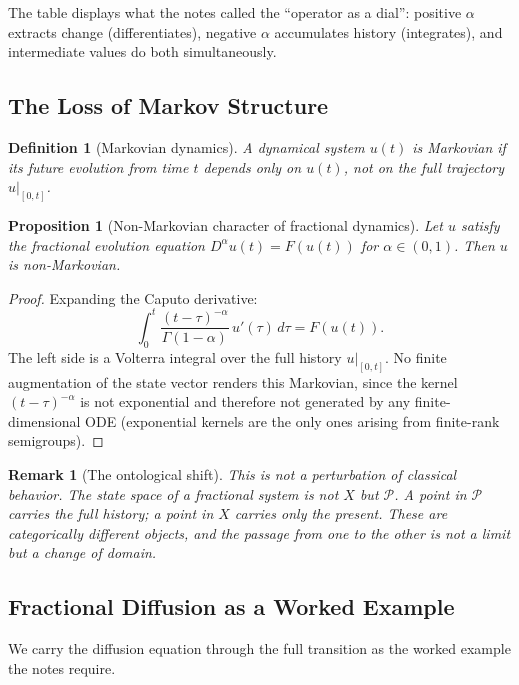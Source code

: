 \documentclass[12pt]{article}
\newtheorem{proposition}[theorem]{Proposition}
\newtheorem{definition}[theorem]{Definition}
\newtheorem{remark}[theorem]{Remark}
\newcommand{\Pcal}{\mathcal{P}}
\begin{document}
The table displays what the notes called the ``operator as a dial'':
positive $\alpha$ extracts change (differentiates), negative $\alpha$
accumulates history (integrates), and intermediate values do both
simultaneously.

\subsection{The Loss of Markov Structure}

\begin{definition}[Markovian dynamics]
A dynamical system $u(t)$ is \emph{Markovian} if its future evolution from
time $t$ depends only on $u(t)$, not on the full trajectory
$u|_{[0,t]}$.
\end{definition}

\begin{proposition}[Non-Markovian character of fractional dynamics]
\label{prop:nonmarkov}
Let $u$ satisfy the fractional evolution equation
$D^\alpha u(t) = F(u(t))$ for $\alpha \in (0,1)$. Then $u$ is
non-Markovian.
\end{proposition}

\begin{proof}
Expanding the Caputo derivative:
\[
  \int_0^t \frac{(t-\tau)^{-\alpha}}{\Gamma(1-\alpha)}\, u'(\tau)\, d\tau = F(u(t)).
\]
The left side is a Volterra integral over the full history $u|_{[0,t]}$.
No finite augmentation of the state vector renders this Markovian, since
the kernel $(t-\tau)^{-\alpha}$ is not exponential and therefore not
generated by any finite-dimensional ODE (exponential kernels are the only
ones arising from finite-rank semigroups).
\end{proof}

\begin{remark}[The ontological shift]
This is not a perturbation of classical behavior. The state space of a
fractional system is not $X$ but $\Pcal$. A point in $\Pcal$ carries the
full history; a point in $X$ carries only the present. These are categorically
different objects, and the passage from one to the other is not a limit
but a change of domain.
\end{remark}

\subsection{Fractional Diffusion as a Worked Example}

We carry the diffusion equation through the full transition as the worked
example the notes require.
\end{document}
